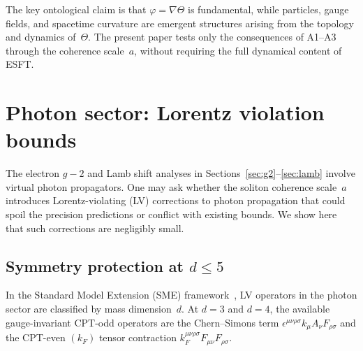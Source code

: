 ﻿\documentclass[a4paper,12pt]{article}
\begin{document}
The key ontological claim is that $\varphi = \nabla\Theta$ is
fundamental, while particles, gauge fields, and spacetime curvature
are emergent structures arising from the topology and dynamics
of~$\Theta$.  The present paper tests only the consequences of A1--A3
through the coherence scale~$a$, without requiring the full dynamical
content of ESFT.

\section{Photon sector: Lorentz violation bounds}
\label{app:photon_LV}

The electron $g{-}2$ and Lamb shift analyses in
Sections~\ref{sec:g2}--\ref{sec:lamb} involve virtual photon
propagators.  One may ask whether the soliton coherence scale~$a$
introduces Lorentz-violating (LV) corrections to photon propagation
that could spoil the precision predictions or conflict with existing
bounds.  We show here that such corrections are negligibly small.

\subsection{Symmetry protection at $d\leq 5$}

In the Standard Model Extension (SME) framework~\cite{Colladay1998,
Kostelecky2009}, LV operators in the photon sector are classified by
mass dimension~$d$.  At $d=3$ and $d=4$, the available gauge-invariant
CPT-odd operators are the Chern--Simons term
$\epsilon^{\mu\nu\rho\sigma}k_\mu A_\nu F_{\rho\sigma}$ and the
CPT-even $(k_F)$ tensor contraction $k_F^{\mu\nu\rho\sigma}
F_{\mu\nu}F_{\rho\sigma}$.
\end{document}
